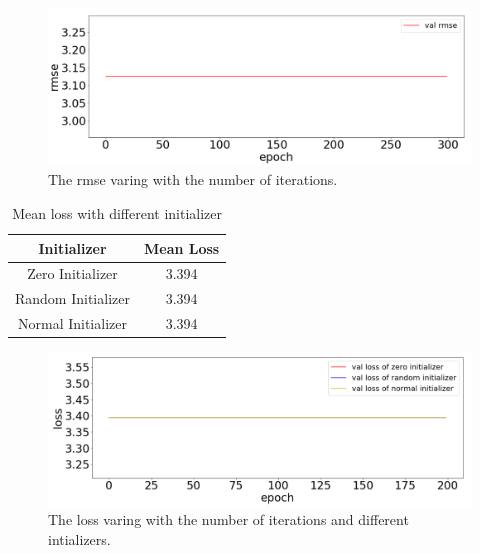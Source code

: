 \documentclass[journal, a4paper]{IEEEtran}
\begin{document}
	\begin{figure}[!hbt]
		\begin{center}
		\includegraphics[width=\columnwidth]{closed-form1}
		\caption{The rmse varing with the number of iterations.}
		\label{fig:closed1}
		\end{center}
	\end{figure}

	\begin{table}[!hbt]
		\begin{center}
		\caption{Mean loss with different initializer}
		\label{tab:lossInitial}
		\begin{tabular}{|c|c|}
			\hline
			Initializer & Mean Loss \\
			\hline
			Zero Initializer & 3.394 \\
			\hline
			Random Initializer & 3.394 \\
			\hline
			Normal Initializer & 3.394 \\
			\hline
		\end{tabular}
		\end{center}
	\end{table}

	\begin{figure}[!hbt]
		\begin{center}
		\includegraphics[width=\columnwidth]{closed-form2}
		\caption{The loss varing with the number of iterations and different intializers.}
		\label{fig:closed2}
		\end{center}
	\end{figure}
	
\end{document}
